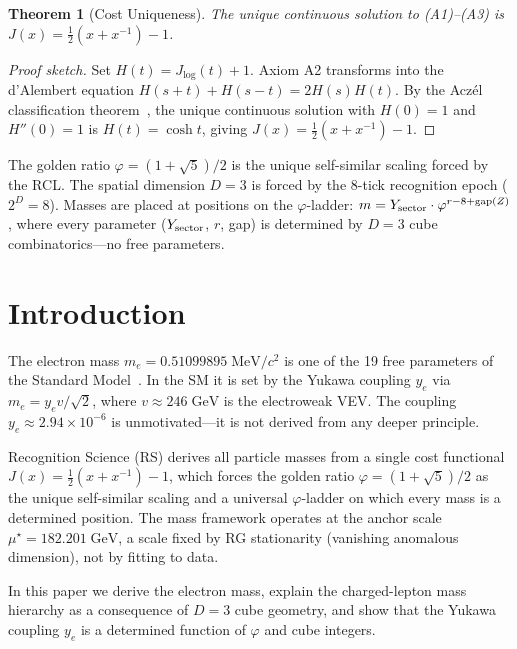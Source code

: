 \documentclass[12pt,a4paper]{article}
\newtheorem{theorem}{Theorem}[section]
\theoremstyle{definition}
\theoremstyle{remark}
\begin{document}
\begin{theorem}[Cost Uniqueness]
\label{thm:unique}
The unique continuous solution to \textup{(A1)--(A3)} is
$J(x) = \tfrac{1}{2}(x + x^{-1}) - 1$.
\end{theorem}

\begin{proof}[Proof sketch]
Set $H(t) = J_{\log}(t)+1$.  Axiom A2 transforms into the d'Alembert
equation $H(s+t)+H(s-t)=2H(s)H(t)$.  By the Acz\'el classification
theorem~\cite{Aczel1966}, the unique continuous solution with $H(0)=1$
and $H''(0)=1$ is $H(t)=\cosh t$, giving
$J(x)=\tfrac{1}{2}(x+x^{-1})-1$.
\end{proof}

\noindent The golden ratio $\varphi=(1+\sqrt{5})/2$ is the unique
self-similar scaling forced by the RCL.  The spatial dimension $D=3$
is forced by the 8-tick recognition epoch ($2^D = 8$).  Masses are
placed at positions on the $\varphi$-ladder:
$m = Y_{\rm sector} \cdot \varphi^{r-8+{\rm gap}(Z)}$,
where every parameter ($Y_{\rm sector}$, $r$, gap) is determined by
$D=3$ cube combinatorics---no free parameters.

\section{Introduction}
\label{sec:intro}

The electron mass $m_e = 0.51099895\;\mathrm{MeV}/c^2$ is one of
the 19 free parameters of the Standard Model~\cite{PDG}.  In the
SM it is set by the Yukawa coupling $y_e$ via
$m_e = y_e v / \sqrt{2}$, where $v \approx 246\;\mathrm{GeV}$
is the electroweak VEV.  The coupling
$y_e \approx 2.94 \times 10^{-6}$ is unmotivated---it is not
derived from any deeper principle.

Recognition Science (RS) derives all particle masses from a
single cost functional $J(x) = \tfrac{1}{2}(x + x^{-1}) - 1$,
which forces the golden ratio $\varphi = (1 + \sqrt{5})/2$ as
the unique self-similar scaling and a universal $\varphi$-ladder
on which every mass is a determined position.  The mass framework
operates at the anchor scale $\mu^\star = 182.201\;\mathrm{GeV}$,
a scale fixed by RG stationarity (vanishing anomalous dimension),
not by fitting to data.

In this paper we derive the electron mass, explain the
charged-lepton mass hierarchy as a consequence of $D = 3$ cube
geometry, and show that the Yukawa coupling $y_e$ is a determined
function of $\varphi$ and cube integers.
\end{document}
